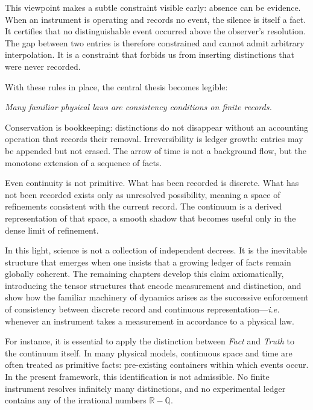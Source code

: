 This viewpoint makes a subtle constraint visible early: absence can be evidence.
When an instrument is operating and records no event, the silence is itself a
fact. It certifies that no distinguishable event occurred above the observer's
resolution. The gap between two entries is therefore constrained and cannot
admit arbitrary interpolation.
It is a constraint that forbids us from inserting
distinctions that were never recorded.

With these rules in place, the central thesis becomes legible:

\begin{center}
\emph{Many familiar physical laws are consistency conditions on finite records.}
\end{center}

Conservation is bookkeeping: distinctions do not disappear without an
accounting operation that records their removal. Irreversibility is ledger
growth: entries may be appended but not erased. The arrow of time is not a
background flow, but the monotone extension of a sequence of facts.

Even continuity is not primitive. What has been recorded is discrete. What has
not been recorded exists only as unresolved possibility, meaning a space of
refinements consistent with the current record. The continuum is
a derived representation of that space, a smooth shadow that becomes useful
only in the dense limit of refinement.

In this light, science is not a collection of independent decrees. It is the
inevitable structure that emerges when one insists that a growing ledger of
facts remain globally coherent. The remaining chapters develop this claim
axiomatically, introducing the tensor structures that encode measurement and
distinction, and show how the familiar machinery of dynamics arises as the
successive enforcement of consistency between discrete record and continuous
representation---\emph{i.e.} whenever an instrument takes a measurement in
accordance to a physical law.

For instance, it is essential to apply the distinction between \emph{Fact} and \emph{Truth} to
the continuum itself. In many physical models, continuous space and time are often
treated as primitive facts: pre-existing containers within which events occur.
In the present framework, this identification is not admissible. No finite
instrument resolves infinitely many distinctions, and no experimental ledger
contains any of the irrational numbers $\mathbb{R}-\mathbb{Q}$. 

